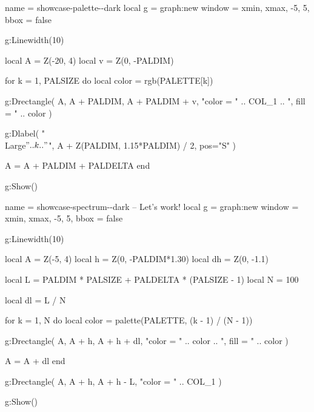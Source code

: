 



{\Huge\bfseries\PALETTE\vphantom{g}}

\medskip

{\itshape \CREDIT}



\bigskip

\begin{luadraw}{name = showcase-palette-\PALETTE-dark}
local g = graph:new{
  window = {xmin, xmax, -5, 5},
  bbox   = false
}

g:Linewidth(10)

local A = Z(-20, 4)
local v = Z(0, -PALDIM)

for k = 1, PALSIZE do
  local color = rgb(PALETTE[k])

  g:Drectangle(
    A, A + PALDIM, A + PALDIM + v,
    "color = " .. COL_1 .. ", fill = " .. color
  )

  g:Dlabel(
    "\\Large$" .. k .. "$",
    A + Z(PALDIM, 1.15*PALDIM) / 2,
    {pos="S"}
  )

  A = A + PALDIM + PALDELTA
end

g:Show()
\end{luadraw}



\bigskip

\begin{luadraw}{name = showcase-spectrum-\PALETTE-dark}
-- Let's work!
local g = graph:new{
  window = {xmin, xmax, -5, 5},
  bbox   = false
}

g:Linewidth(10)

local A  = Z(-5, 4)
local h  = Z(0, -PALDIM*1.30)
local dh = Z(0, -1.1)

local L = PALDIM * PALSIZE + PALDELTA * (PALSIZE - 1)
local N = 100

local dl = L / N

for k = 1, N do
  local color = palette(PALETTE, (k - 1) / (N - 1))

  g:Drectangle(
    A, A + h, A + h + dl,
    "color = " .. color .. ", fill = " .. color
  )

  A = A + dl
end

g:Drectangle(
  A, A + h, A + h - L,
  "color = " .. COL_1
)

g:Show()
\end{luadraw}


